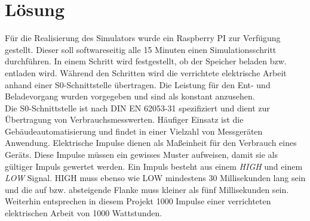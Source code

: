 \section{Lösung}\label{solution}
Für die Realisierung des Simulators wurde ein Raspberry PI zur Verfügung gestellt. Dieser soll softwareseitig alle 15 Minuten einen Simulationsschritt durchführen. In einem Schritt wird festgestellt, ob der Speicher beladen bzw. entladen wird. Während den Schritten wird die verrichtete elektrische Arbeit anhand einer S0-Schnittstelle übertragen. Die Leistung für den Ent- und Beladevorgang wurden vorgegeben und sind als konstant anzusehen.\\
Die S0-Schnittstelle ist nach DIN EN 62053-31 spezifiziert und dient zur Übertragung von Verbrauchsmesswerten. Häufiger Einsatz ist die Gebäudeautomatisierung und findet in einer Vielzahl von Messgeräten Anwendung. Elektrische Impulse dienen als Maßeinheit für den Verbrauch eines Geräts. Diese Impulse müssen ein gewisses Muster aufweisen, damit sie als gültiger Impuls gewertet werden. Ein Impuls besteht aus einem \emph{HIGH} und einem \emph{LOW} Signal. HIGH muss ebenso wie LOW mindestens 30 Millisekunden lang sein und die auf bzw. absteigende Flanke muss kleiner als fünf Millisekunden sein. Weiterhin entsprechen in diesem Projekt 1000 Impulse einer verrichteten elektrischen Arbeit von 1000 Wattstunden.